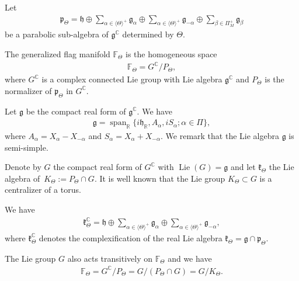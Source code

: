 \documentclass[10pt,a4paper]{amsart}
\numberwithin{equation}{section}
\DeclareMathOperator{\Span}{span}
\DeclareMathOperator{\Lie}{Lie}
\begin{document}
Let
\begin{gather*}
\mathfrak{p}_{\Theta}=\mathfrak{h}\oplus
\sum_{\alpha\in\langle\Theta\rangle^{+}}\mathfrak{g}_{\alpha}\oplus
\sum_{\alpha\in\langle\Theta\rangle^{+}}\mathfrak{g}_{-\alpha}\oplus
\sum_{\beta\in \Pi_{M}^{+}}\mathfrak{g}_{\beta}
\end{gather*}
be a parabolic sub-algebra of $\mathfrak{g}^\mathbb{C}$ determined by $\Theta$.

The generalized flag manifold $\mathbb{F}_{\Theta}$ is the homogeneous space
\begin{gather*}
\mathbb{F}_{\Theta}=G^\mathbb{C}/P_{\Theta},
\end{gather*}
where $G^\mathbb{C}$ is a complex connected Lie group with Lie algebra $\mathfrak{g}^\mathbb{C}$ and $P_{\Theta}$ is the normalizer of $\mathfrak{p}_{\Theta}$ in $G^\mathbb{C}$.

Let $\mathfrak{g}$ be the compact real form of $\mathfrak{g}^\mathbb{C}$. %
We have
\begin{gather*}
\mathfrak{g}=\Span_{\mathbb{R}}\{i\mathfrak{h}_{\mathbb{R}},A_{\alpha},iS_{\alpha}; \alpha\in \Pi\},
\end{gather*}
where $A_{\alpha}=X_{\alpha}-X_{-\alpha}$ and $S_{\alpha}=X_{\alpha}+X_{-\alpha}$. We remark that the Lie algebra $\mathfrak{g}$ is semi-simple.

Denote by $G$ the compact real form of $G^\mathbb{C}$ with $\Lie(G)=\mathfrak{g}$ and let $\mathfrak{k}_{\Theta}$ the Lie algebra of~$K_{\Theta}:=P_{\Theta}\cap G$. It is well known that the Lie group $K_{\Theta}\subset G$ is a centralizer of a torus.

We have
\begin{gather*}
\mathfrak{k}_{\Theta}^{\mathbb{C}}=\mathfrak{h}\oplus
\sum_{\alpha\in\langle\Theta\rangle^{+}}\mathfrak{g}_{\alpha}\oplus
\sum_{\alpha\in\langle\Theta\rangle^{+}}\mathfrak{g}_{-\alpha},
\end{gather*}
where $\mathfrak{k}_{\Theta}^{\mathbb{C}}$ denotes the complexification of the real Lie algebra $\mathfrak{k}_{\Theta}=\mathfrak{g}\cap \mathfrak{p}_{\Theta}$.

The Lie group $G$ also acts transitively on $\mathbb{F}_{\Theta}$ and we have
\begin{gather*}
\mathbb{F}_{\Theta}=G^\mathbb{C}/P_{\Theta}=G/(P_{\Theta}\cap G)=G/K_{\Theta}.
\end{gather*}
\end{document}

